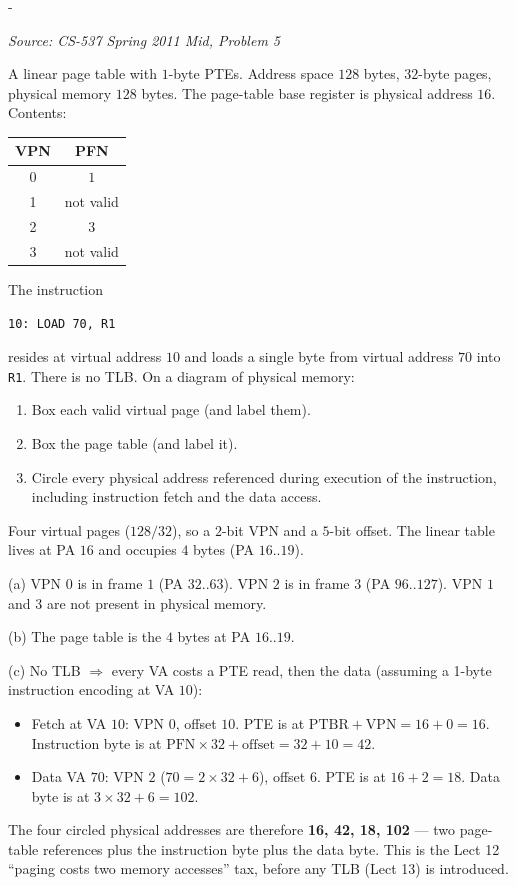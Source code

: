 \documentclass[11pt,a4paper]{article}
\makeatletter
\newcommand{\keepspace}[1]{\par\penalty-100\begingroup
  \setlength{\dimen@}{#1}\dimen@ii\pagegoal\advance\dimen@ii-\pagetotal
  \ifdim\dimen@>\dimen@ii\ifdim\dimen@ii>\z@\vfil\fi\break\fi\endgroup}
\newcounter{qn}[section]
\newenvironment{Qn}[4]{%
  \refstepcounter{qn}\keepspace{7\baselineskip}%
  \begin{tcolorbox}[qboxstyle, title={Q\thesection.\theqn\ \ [#1 \textbar\ #2]\ \ #4}]%
  {\footnotesize\color{g3}\textit{Source: #3}}\par\smallskip%
}{%
  \end{tcolorbox}%
}
\newenvironment{Sol}{%
  \begin{tcolorbox}[sboxstyle, title={Solution}]%
}{%
  \end{tcolorbox}\vspace{0.35em}%
}
\makeatother
\begin{document}
\begin{Qn}{Hard}{Lect 12}{CS-537 Spring 2011 Mid, Problem 5}{Which physical bytes are touched to fetch and execute one load?}
A linear page table with $1$-byte PTEs. Address space $128$ bytes,
$32$-byte pages, physical memory $128$ bytes. The page-table base
register is physical address $16$. Contents:

\begin{center}
\begin{tabular}{c|c}
VPN & PFN \\
\hline
0 & $1$ \\
1 & not valid \\
2 & $3$ \\
3 & not valid \\
\end{tabular}
\end{center}

The instruction
\begin{lstlisting}[numbers=none]
10: LOAD 70, R1
\end{lstlisting}
resides at virtual address $10$ and loads a single byte from virtual
address $70$ into \texttt{R1}. There is no TLB. On a diagram of
physical memory:
\begin{enumerate}
  \item[(a)] Box each valid virtual page (and label them).
  \item[(b)] Box the page table (and label it).
  \item[(c)] Circle every physical address referenced during execution
        of the instruction, including instruction fetch and the data
        access.
\end{enumerate}
\end{Qn}
\begin{Sol}
Four virtual pages ($128/32$), so a $2$-bit VPN and a $5$-bit offset.
The linear table lives at PA $16$ and occupies $4$ bytes
(PA $16..19$).

(a) VPN $0$ is in frame $1$ (PA $32..63$). VPN $2$ is in frame $3$
(PA $96..127$). VPN $1$ and $3$ are not present in physical memory.

(b) The page table is the $4$ bytes at PA $16..19$.

(c) No TLB $\Rightarrow$ every VA costs a PTE read, then the data
(assuming a 1-byte instruction encoding at VA $10$):
\begin{itemize}
  \item Fetch at VA $10$: VPN $0$, offset $10$. PTE is at
        $\mathrm{PTBR}+\mathrm{VPN}=16+0=16$. Instruction byte is at
        $\mathrm{PFN}\times 32+\mathrm{offset}=32+10=42$.
  \item Data VA $70$: VPN $2$ ($70=2\times 32+6$), offset $6$. PTE is
        at $16+2=18$. Data byte is at $3\times 32+6=102$.
\end{itemize}
The four circled physical addresses are therefore \textbf{16, 42, 18,
102} --- two page-table references plus the instruction byte plus the
data byte. This is the Lect 12 ``paging costs two memory accesses''
tax, before any TLB (Lect 13) is introduced.
\end{Sol}
\end{document}
